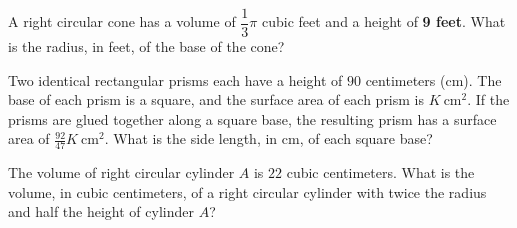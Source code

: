 \vspace{0.75em}


\vspace{2em}
\newpage
\noindent\markforreview
\vspace{1em}

A right circular cone has a volume of $\dfrac{1}{3}\pi$ cubic feet and a height of \textbf{9 feet}.  
What is the radius, in feet, of the base of the cone?

\vspace{0.75em}


\vspace{2em}


\noindent\markforreview
\vspace{1em}

Two identical rectangular prisms each have a height of $90$ centimeters (cm).  
The base of each prism is a square, and the surface area of each prism is $K\ \text{cm}^2$.  
If the prisms are glued together along a square base, the resulting prism has a surface area of $\frac{92}{47}K\ \text{cm}^2$.  
What is the side length, in cm, of each square base?

\vspace{0.75em}


\vspace{2em}


\newpage
\noindent\markforreview
\vspace{1em}

The volume of right circular cylinder $A$ is $22$ cubic centimeters.  
What is the volume, in cubic centimeters, of a right circular cylinder with twice the radius and half the height of cylinder $A$?

\vspace{0.75em}


\vspace{2em}
\noindent\markforreview
\begin{center}
\end{center}




